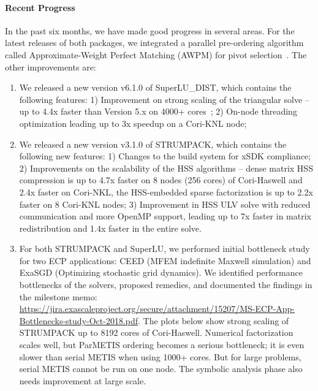 \paragraph{Recent Progress}
In the past six months, we have made good progress in several areas.
For the latest releases of both packages, we integrated a parallel
pre-ordering algorithm called Approximate-Weight Perfect Matching (AWPM)
for pivot selection~\cite{AWPM2018}. The other improvements are:
\begin{enumerate}
\item We released a new version v6.1.0 of SuperLU\_DIST, which contains
      the following features:
      1) Improvement on strong scaling of the 
      triangular solve -- up to 4.4x faster than Version 5.x on 4000+
      cores~\cite{LiuTriSolve2018};
      2) On-node threading optimization leading up to 3x speedup on a Cori-KNL node;
\item We released a new version v3.1.0 of STRUMPACK, which contains the
      following new features:
      1) Changes to the build system for xSDK compliance;
      2) Improvements on the scalability of the HSS algorithms --
      dense matrix HSS compression is up to 4.7x faster on 8 nodes (256 cores)
      of Cori-Haswell and 2.4x faster on Cori-NKL, the HSS-embedded sparse
      factorization is up to 2.2x faster on 8 Cori-KNL nodes;
      3) Improvement in HSS ULV solve with reduced communication and more
      OpenMP support, leading up to 7x faster in matrix redistribution and
      1.4x faster in the entire solve.
\item For both STRUMPACK and SuperLU, we performed initial bottleneck study
  for two ECP applications: CEED (MFEM indefinite Maxwell simulation) and
  ExaSGD (Optimizing stochastic grid dynamics). We identified performance
  bottlenecks of the solvers, proposed remedies, and documented the
  findings in the milestone memo: 
{\url{https://jira.exascaleproject.org/secure/attachment/15207/MS-ECP-App-Bottlenecks-study-Oct-2018.pdf}}.
  The plots below show strong scaling of STRUMPACK up to 8192 cores of 
  Cori-Haswell. Numerical factorization scales well, but ParMETIS ordering 
  becomes a serious bottleneck; it is even slower than serial METIS when using
  1000+ cores. But for large problems, serial METIS cannot be run on one node.
  The symbolic analysis phase also needs improvement at large scale.
\end{enumerate}

